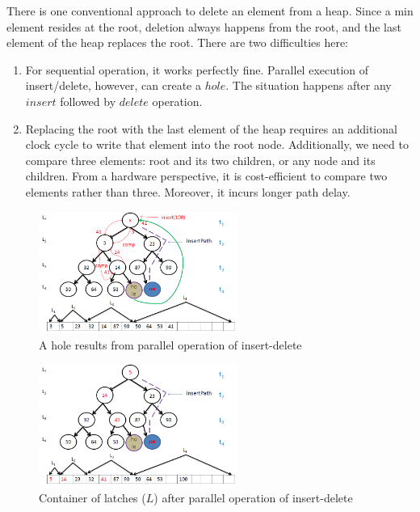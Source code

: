 \documentclass[10pt, conference, compsocconf]{IEEEtran}
\begin{document}
There is one conventional approach to delete an element from a heap.
Since a min element resides at the root, deletion always happens from the root, and the last element of the heap replaces the root. There are two difficulties here:

\begin{enumerate}
\item For sequential operation, it works perfectly fine. Parallel execution of insert/delete, however, can create a $hole$. The situation happens after any $insert$ followed by $delete$ operation.
\item Replacing the root with the last element of the heap requires an additional clock cycle to write that element into the root node. Additionally, we need to compare three elements: root and its two children, or any node and its children. From a hardware perspective, it is cost-efficient to compare two elements rather than three. Moreover, it incurs longer path delay.
\end{enumerate}


\begin{figure}[!ht]
  \centering
  \includegraphics[width=6.5cm]{Figures/8.png}
      \caption{A hole results from parallel operation of insert-delete}
    \label{fig8}
\end{figure}

\begin{figure}[!ht]
  \centering
  \includegraphics[width=6.5cm]{Figures/9.png}
      \caption{Container of latches ($L$) after parallel operation of insert-delete}
    \label{fig9}
\end{figure}
\end{document}
